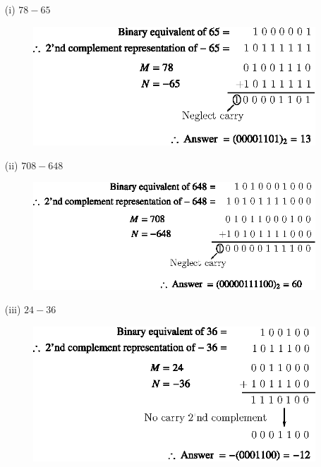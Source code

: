 \begin{solution}
\begin{itemize}
\item[(i)] $78-65$
\begin{figure}[H]
\centering
\includegraphics{chap5/div38.eps}
\end{figure}

\item[(ii)] $708-648$
\begin{figure}[H]
\centering
\includegraphics{chap5/div39.eps}
\end{figure}

\item[(iii)] $24-36$
\begin{figure}[H]
\centering
\includegraphics{chap5/div40.eps}
\end{figure}

\eject


\end{itemize}
\end{solution}
